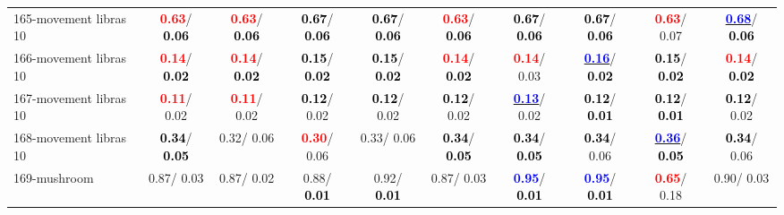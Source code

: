 \begin{table}[h]
\begin{center}
{\begin{tabular}{lc|c|c|c|c|c|c|c|c}
165-movement libras 10 & \textcolor{red}{\textbf{  0.63}}/\textcolor{black}{\textbf{  0.06}} & \textcolor{red}{\textbf{  0.63}}/\textcolor{black}{\textbf{  0.06}} & \textcolor{black}{\textbf{  0.67}}/\textcolor{black}{\textbf{  0.06}} & \textcolor{black}{\textbf{  0.67}}/\textcolor{black}{\textbf{  0.06}} & \textcolor{red}{\textbf{  0.63}}/\textcolor{black}{\textbf{  0.06}} & \textcolor{black}{\textbf{  0.67}}/\textcolor{black}{\textbf{  0.06}} & \textcolor{black}{\textbf{  0.67}}/\textcolor{black}{\textbf{  0.06}} & \textcolor{red}{\textbf{  0.63}}/  0.07 & \underline{\textcolor{blue}{\textbf{  0.68}}}/\textcolor{black}{\textbf{  0.06}} \\
166-movement libras 10 & \textcolor{red}{\textbf{  0.14}}/\textcolor{black}{\textbf{  0.02}} & \textcolor{red}{\textbf{  0.14}}/\textcolor{black}{\textbf{  0.02}} & \textcolor{black}{\textbf{  0.15}}/\textcolor{black}{\textbf{  0.02}} & \textcolor{black}{\textbf{  0.15}}/\textcolor{black}{\textbf{  0.02}} & \textcolor{red}{\textbf{  0.14}}/\textcolor{black}{\textbf{  0.02}} & \textcolor{red}{\textbf{  0.14}}/  0.03 & \underline{\textcolor{blue}{\textbf{  0.16}}}/\textcolor{black}{\textbf{  0.02}} & \textcolor{black}{\textbf{  0.15}}/\textcolor{black}{\textbf{  0.02}} & \textcolor{red}{\textbf{  0.14}}/\textcolor{black}{\textbf{  0.02}} \\
167-movement libras 10 & \textcolor{red}{\textbf{  0.11}}/  0.02 & \textcolor{red}{\textbf{  0.11}}/  0.02 & \textcolor{black}{\textbf{  0.12}}/  0.02 & \textcolor{black}{\textbf{  0.12}}/  0.02 & \textcolor{black}{\textbf{  0.12}}/  0.02 & \underline{\textcolor{blue}{\textbf{  0.13}}}/  0.02 & \textcolor{black}{\textbf{  0.12}}/\textcolor{black}{\textbf{  0.01}} & \textcolor{black}{\textbf{  0.12}}/\textcolor{black}{\textbf{  0.01}} & \textcolor{black}{\textbf{  0.12}}/  0.02 \\ \hline
168-movement libras 10 & \textcolor{black}{\textbf{  0.34}}/\textcolor{black}{\textbf{  0.05}} &   0.32/  0.06 & \textcolor{red}{\textbf{  0.30}}/  0.06 &   0.33/  0.06 & \textcolor{black}{\textbf{  0.34}}/\textcolor{black}{\textbf{  0.05}} & \textcolor{black}{\textbf{  0.34}}/\textcolor{black}{\textbf{  0.05}} & \textcolor{black}{\textbf{  0.34}}/  0.06 & \underline{\textcolor{blue}{\textbf{  0.36}}}/\textcolor{black}{\textbf{  0.05}} & \textcolor{black}{\textbf{  0.34}}/  0.06 \\
169-mushroom &   0.87/  0.03 &   0.87/  0.02 &   0.88/\textcolor{black}{\textbf{  0.01}} &   0.92/\textcolor{black}{\textbf{  0.01}} &   0.87/  0.03 & \textcolor{blue}{\textbf{  0.95}}/\textcolor{black}{\textbf{  0.01}} & \textcolor{blue}{\textbf{  0.95}}/\textcolor{black}{\textbf{  0.01}} & \textcolor{red}{\textbf{  0.65}}/  0.18 &   0.90/  0.03 \\

\end{tabular}}
\end{center}
\end{table}
